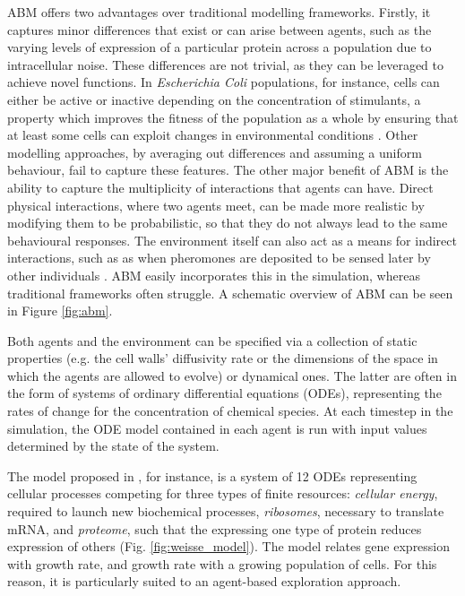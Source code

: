 \documentclass[bsc,frontabs,singlespacing,parskip,deptreport]{infthesis}
\begin{document}
ABM offers two advantages over traditional modelling frameworks. Firstly, it captures minor differences that exist or can arise between agents, such as the varying levels of expression of a particular protein across a population due to intracellular noise. These differences are not trivial, as they can be leveraged to achieve novel functions. In \textit{Escherichia Coli} populations, for instance, cells can either be active or inactive depending on the concentration of stimulants, a property which improves the fitness of the population as a whole by ensuring that at least some cells can exploit changes in environmental conditions \cite{pmid14973486}. Other modelling approaches, by averaging out differences and assuming a uniform behaviour, fail to capture these features. The other major benefit of ABM is the ability to capture the multiplicity of interactions that agents can have. Direct physical interactions, where two agents meet, can be made more realistic by modifying them to be probabilistic, so that they do not always lead to the same behavioural responses. The environment itself can also act as a means for indirect interactions, such as as when pheromones are deposited to be sensed later by other individuals \cite{pmid26400200}. ABM easily incorporates this in the simulation, whereas traditional frameworks often struggle. A schematic overview of ABM can be seen in Figure \ref{fig:abm}.

Both agents and the environment can be specified via a collection of static properties (e.g. the cell walls' diffusivity rate or the dimensions of the space in which the agents are allowed to evolve) or dynamical ones. The latter are often in the form of systems of ordinary differential equations (ODEs), representing the rates of change for the concentration of chemical species. At each timestep in the simulation, the ODE model contained in each agent is run with input values determined by the state of the system. 

The model proposed in \cite{P21}, for instance, is a system of 12 ODEs representing cellular processes competing for three types of finite resources: \textit{cellular energy}, required to launch new biochemical processes, \textit{ribosomes}, necessary to translate mRNA, and \textit{proteome}, such that the expressing one type of protein reduces expression of others (Fig. \ref{fig:weisse_model}). The model relates gene expression with growth rate, and growth rate with a growing population of cells. For this reason, it is particularly suited to an agent-based exploration approach.
\end{document}
